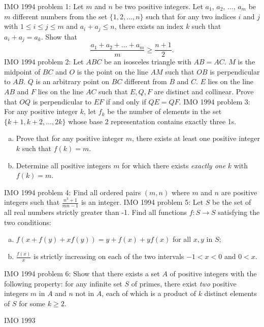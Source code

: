 IMO 1994 problem 1:  Let $ m$ and $ n$ be two positive integers. Let $ a_1$, $ a_2$, $ \ldots$, $ a_m$ be $ m$ different numbers from the set $ \{1, 2,\ldots, n\}$ such that for any two indices $ i$ and $ j$ with $ 1\leq i \leq j \leq m$ and $ a_i + a_j \leq n$, there exists an index $ k$ such that $ a_i + a_j = a_k$. Show that
\[ \frac {a_1 + a_2 + ... + a_m}{m} \geq \frac {n + 1}{2}. \] 
IMO 1994 problem 2:  Let $ ABC$ be an isosceles triangle with $ AB = AC$. $ M$ is the midpoint of $ BC$ and $ O$ is the point on the line $ AM$ such that $ OB$ is perpendicular to $ AB$. $ Q$ is an arbitrary point on $ BC$ different from $ B$ and $ C$. $ E$ lies on the line $ AB$ and $ F$ lies on the line $ AC$ such that $ E, Q, F$ are distinct and collinear. Prove that $ OQ$ is perpendicular to $ EF$ if and only if $ QE = QF$. 
IMO 1994 problem 3:  For any positive integer $ k$, let $ f_k$ be the number of elements in the set $ \{ k + 1, k + 2, \ldots, 2k\}$ whose base 2 representation contains exactly three 1s.
\begin{enumerate}[(a)]
  \item Prove that for any positive integer $ m$, there exists at least one positive integer $ k$ such that $ f(k) = m$.
  \item Determine all positive integers $ m$ for which there exists \textit{exactly one} $ k$ with $ f(k) = m$.
\end{enumerate} 
IMO 1994 problem 4:  Find all ordered pairs $ (m,n)$ where $ m$ and $ n$ are positive integers such that $ \frac {n^3 + 1}{mn - 1}$ is an integer. 
IMO 1994 problem 5:  Let $ S$ be the set of all real numbers strictly greater than -1. Find all functions $ f: S \to S$ satisfying the two conditions:
\begin{enumerate}[(a)]
  \item $ f(x + f(y) + xf(y)) = y + f(x) + yf(x)$ for all $ x, y$ in $ S$;
  \item $ \frac {f(x)}{x}$ is strictly increasing on each of the two intervals $ - 1 < x < 0$ and $ 0 < x$.
\end{enumerate} 
IMO 1994 problem 6:  Show that there exists a set $ A$ of positive integers with the following property: for any infinite set $ S$ of primes, there exist \textit{two} positive integers $ m$ in $ A$ and $ n$ not in $ A$, each of which is a product of $ k$ distinct elements of $ S$ for some $ k \geq 2$. 

IMO 1993 

